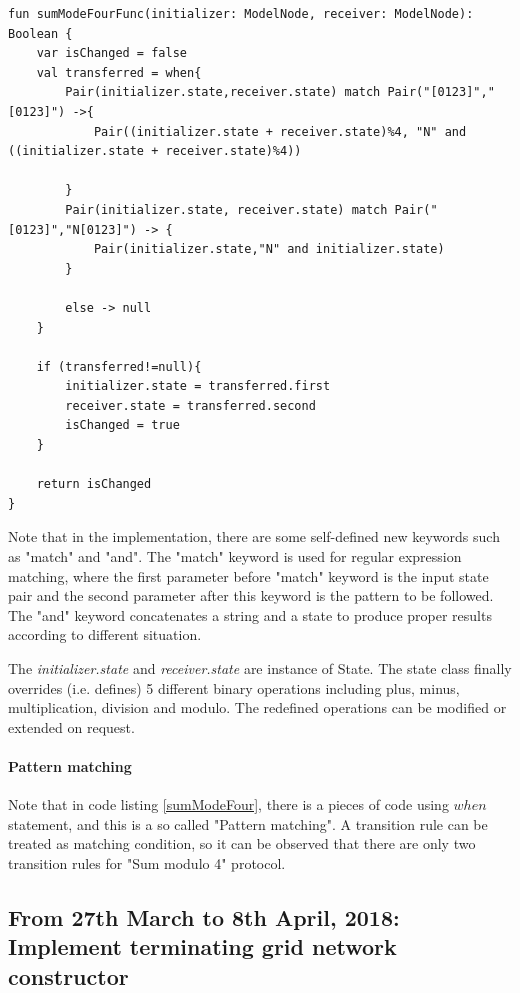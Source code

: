 \begin{lstlisting}[caption = {Implementation for transition function of sum (mod 4) protocol},label={sumModeFour},style = mykotlin]
fun sumModeFourFunc(initializer: ModelNode, receiver: ModelNode): Boolean {
    var isChanged = false
    val transferred = when{
        Pair(initializer.state,receiver.state) match Pair("[0123]","[0123]") ->{
            Pair((initializer.state + receiver.state)%4, "N" and ((initializer.state + receiver.state)%4))

        }
        Pair(initializer.state, receiver.state) match Pair("[0123]","N[0123]") -> {
            Pair(initializer.state,"N" and initializer.state)
        }

        else -> null
    }

    if (transferred!=null){
        initializer.state = transferred.first
        receiver.state = transferred.second
        isChanged = true
    }

    return isChanged
}\end{lstlisting}
\par\noindent
Note that in the implementation, there are some self-defined new keywords such as "match" and "and". The "match" keyword is used for regular expression matching,
where the first parameter before "match" keyword is the input state pair and the second parameter after this keyword is the pattern to be followed.
The "and" keyword concatenates a string and a state to produce proper results according to different situation.
\par\noindent
The \textit{initializer.state} and \textit{receiver.state} are instance of State.
The state class finally overrides (i.e. defines) 5 different binary operations including plus, minus, multiplication, division and modulo. The
redefined operations can be modified or extended on request.

\paragraph{Pattern matching}
Note that in code listing \ref{sumModeFour}, there is a pieces of code using $when$ statement, and this is a so called
"Pattern matching". A transition rule can be treated as matching condition, so it can be observed that there are only two
transition rules for "Sum modulo 4" protocol.


\subsection{From 27th March to 8th April, 2018: Implement terminating grid network constructor}
